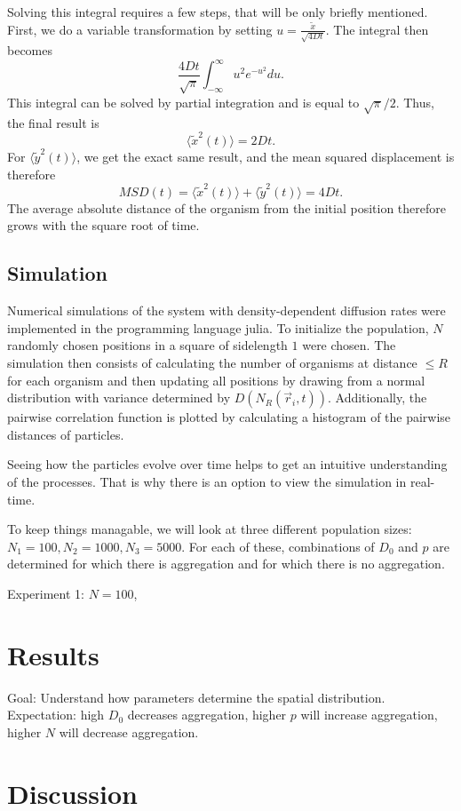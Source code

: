 \documentclass{article}
\begin{document}
Solving this integral requires a few steps, that will be only briefly mentioned. 
First, we do a variable transformation by setting $u = \frac{\tilde{x}}{\sqrt{4Dt}}$. 
The integral then becomes
\begin{equation*}
    \frac{4Dt}{\sqrt{\pi}}\int_{-\infty}^{\infty} u^2  e^{-u^2}du.
\end{equation*}
This integral can be solved by partial integration and is equal to $\sqrt{\pi}/2$.
Thus, the final result is 
\begin{equation*}
    \langle \tilde{x}^2(t)\rangle = 2Dt.
\end{equation*}
For $\langle \tilde{y}^2(t)\rangle$, we get the exact same result, and the mean squared displacement is therefore
\begin{equation*}
    MSD(t) = \langle \tilde{x}^2(t)\rangle + \langle \tilde{y}^2(t)\rangle  = 4Dt.
\end{equation*}
The average absolute distance of the organism from the initial position therefore grows with the square root of time.

\subsection{Simulation}
Numerical simulations of the system with density-dependent diffusion rates were implemented in the programming language julia.
To initialize the population, $N$ randomly chosen positions in a square of sidelength $1$ were chosen.
The simulation then consists of calculating the number of organisms at distance $\leq R$ for each organism and then updating all positions by drawing from a normal distribution with variance determined by $D(N_R(\vec{r}_i, t))$.
Additionally, the pairwise correlation function is plotted by calculating a histogram of the pairwise distances of particles.

Seeing how the particles evolve over time helps to get an intuitive understanding of the processes.
That is why there is an option to view the simulation in real-time.

To keep things managable, we will look at three different population sizes: $N_1=100, N_2 = 1000, N_3 = 5000$. 
For each of these, combinations of $D_0$ and $p$ are determined for which there is aggregation and for which there is no aggregation.

Experiment 1: $N=100$, 
\section{Results}
Goal: Understand how parameters determine the spatial distribution.
Expectation: high $D_0$ decreases aggregation, higher $p$ will increase aggregation, higher $N$ will decrease aggregation.


\section{Discussion}
\printbibliography
\end{document}
